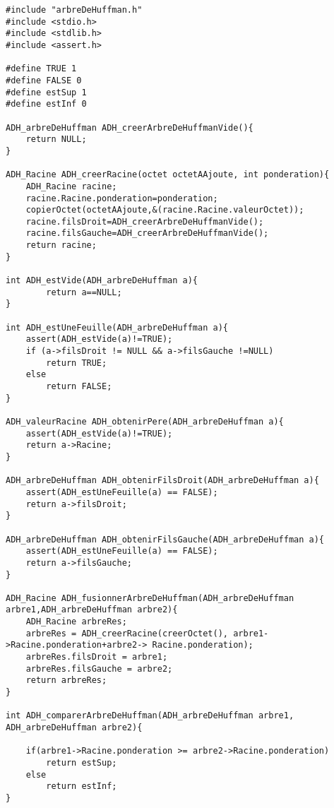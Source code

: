 \begin{verbatim}
#include "arbreDeHuffman.h"
#include <stdio.h>
#include <stdlib.h>
#include <assert.h>

#define TRUE 1
#define FALSE 0
#define estSup 1
#define estInf 0

ADH_arbreDeHuffman ADH_creerArbreDeHuffmanVide(){
	return NULL;
}

ADH_Racine ADH_creerRacine(octet octetAAjoute, int ponderation){
	ADH_Racine racine;
	racine.Racine.ponderation=ponderation;
	copierOctet(octetAAjoute,&(racine.Racine.valeurOctet));
	racine.filsDroit=ADH_creerArbreDeHuffmanVide();
	racine.filsGauche=ADH_creerArbreDeHuffmanVide();
	return racine;
}

int ADH_estVide(ADH_arbreDeHuffman a){	
		return a==NULL;
}

int ADH_estUneFeuille(ADH_arbreDeHuffman a){
	assert(ADH_estVide(a)!=TRUE);
	if (a->filsDroit != NULL && a->filsGauche !=NULL)
		return TRUE;
	else
		return FALSE;
}

ADH_valeurRacine ADH_obtenirPere(ADH_arbreDeHuffman a){
	assert(ADH_estVide(a)!=TRUE);
	return a->Racine;
}

ADH_arbreDeHuffman ADH_obtenirFilsDroit(ADH_arbreDeHuffman a){
	assert(ADH_estUneFeuille(a) == FALSE);
	return a->filsDroit;
}

ADH_arbreDeHuffman ADH_obtenirFilsGauche(ADH_arbreDeHuffman a){
	assert(ADH_estUneFeuille(a) == FALSE);
	return a->filsGauche;
}

ADH_Racine ADH_fusionnerArbreDeHuffman(ADH_arbreDeHuffman arbre1,ADH_arbreDeHuffman arbre2){
	ADH_Racine arbreRes;
	arbreRes = ADH_creerRacine(creerOctet(), arbre1->Racine.ponderation+arbre2-> Racine.ponderation);
	arbreRes.filsDroit = arbre1;
	arbreRes.filsGauche = arbre2;	
	return arbreRes;
}

int ADH_comparerArbreDeHuffman(ADH_arbreDeHuffman arbre1, ADH_arbreDeHuffman arbre2){
	
	if(arbre1->Racine.ponderation >= arbre2->Racine.ponderation)
		return estSup;
	else
		return estInf;
}
\end{verbatim}
 
